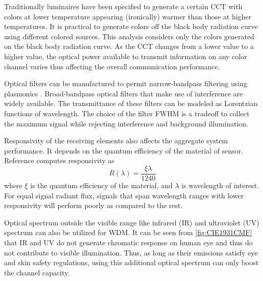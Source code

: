 Traditionally luminaires have been specified to generate a certain CCT with colors at lower temperature appearing (ironically) warmer than those at higher temperatures. It is practical to generate colors off the black body radiation curve using different colored sources. This analysis considers only the colors generated on the black body radiation curve. As the CCT changes from a lower value to a higher value, the optical power available to transmit information on any color channel varies thus affecting the overall communication performance.

Optical filters can be manufactured to permit narrow-bandpass filtering using plasmonics \cite{xu10a,yok12a}. Broad-bandpass optical filters that make use of interference are widely available. The transmittance of these filters can be modeled as Lorentzian functions of wavelength. The choice of the filter FWHM is a tradeoff to collect the maximum signal while rejecting interference and background illumination.

Responsivity of the receiving elements also affects the aggregate system performance. It depends on the quantum efficiency of the material of sensor. Reference \cite{gha12a} computes responsivity as
\begin{equation}
\label{eqResponsivity}
	 R(\lambda) = \frac{\xi\lambda}{1240}
\end{equation}
where $\xi$ is the quantum efficiency of the material, and $\lambda$ is wavelength of interest. For equal signal radiant flux, signals that span wavelength ranges with lower responsivity will perform poorly as compared to the rest. 

Optical spectrum outside the visible range like infrared (IR) and ultraviolet (UV) spectrum can also be utilized for WDM. It can be seen from \figurename{\ref{fig:CIE1931CMF}} that IR and UV do not generate chromatic response on human eye and thus do not contribute to visible illumination. Thus, as long as their emissions satisfy eye and skin safety regulations, using this additional optical spectrum can only boost the channel capacity.
